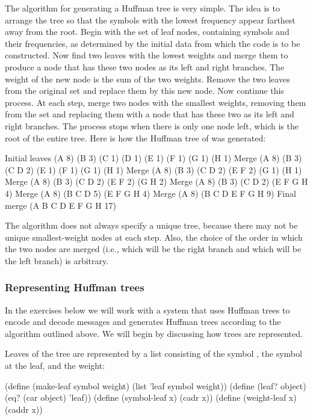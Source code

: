 The algorithm for generating a Huffman tree is very simple. The idea is to
arrange the tree so that the symbols with the lowest frequency appear farthest
away from the root. Begin with the set of leaf nodes, containing symbols and
their frequencies, as determined by the initial data from which the code is to
be constructed. Now find two leaves with the lowest weights and merge them to
produce a node that has these two nodes as its left and right branches. The
weight of the new node is the sum of the two weights. Remove the two leaves
from the original set and replace them by this new node. Now continue this
process. At each step, merge two nodes with the smallest weights, removing them
from the set and replacing them with a node that has these two as its left and
right branches. The process stops when there is only one node left, which is
the root of the entire tree.  Here is how the Huffman tree of 
was generated:

\begin{example}
Initial leaves  {(A 8) (B 3) (C 1) (D 1) (E 1) (F 1) (G 1) (H 1)}
         Merge  {(A 8) (B 3) ({C D} 2) (E 1) (F 1) (G 1) (H 1)}
         Merge  {(A 8) (B 3) ({C D} 2) ({E F} 2) (G 1) (H 1)}
         Merge  {(A 8) (B 3) ({C D} 2) ({E F} 2) ({G H} 2)}
         Merge  {(A 8) (B 3) ({C D} 2) ({E F G H} 4)}
         Merge  {(A 8) ({B C D} 5) ({E F G H} 4)}
         Merge  {(A 8) ({B C D E F G H} 9)}
   Final merge  {({A B C D E F G H} 17)}
\end{example}

\noindent
The algorithm does not always specify a unique tree, because there may not be
unique smallest-weight nodes at each step.  Also, the choice of the order in
which the two nodes are merged (i.e., which will be the right branch and which
will be the left branch) is arbitrary.

\subsubsection*{Representing Huffman trees}

In the exercises below we will work with a system that uses Huffman trees to
encode and decode messages and generates Huffman trees according to the
algorithm outlined above.  We will begin by discussing how trees are
represented.

Leaves of the tree are represented by a list consisting of the symbol
, the symbol at the leaf, and the weight:

\begin{codeBlock}
(define (make-leaf symbol weight) (list 'leaf
                                        symbol
                                        weight))
(define (leaf? object) (eq? (car object) 'leaf))
(define (symbol-leaf x) (cadr x))
(define (weight-leaf x) (caddr x))
\end{codeBlock}

